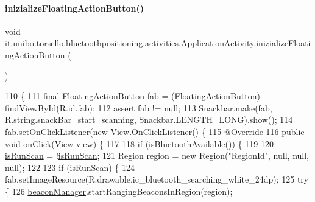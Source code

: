 \paragraph{\texorpdfstring{inizialize\+Floating\+Action\+Button()}{inizializeFloatingActionButton()}}
{\footnotesize\ttfamily void it.\+unibo.\+torsello.\+bluetoothpositioning.\+activities.\+Application\+Activity.\+inizialize\+Floating\+Action\+Button (\begin{DoxyParamCaption}{ }\end{DoxyParamCaption})\hspace{0.3cm}{\ttfamily [private]}}


\begin{DoxyCode}
110                                                   \{
111         \textcolor{keyword}{final} FloatingActionButton fab = (FloatingActionButton) findViewById(R.id.fab);
112         assert fab != null;
113         Snackbar.make(fab, R.string.snackBar\_start\_scanning, Snackbar.LENGTH\_LONG).show();
114         fab.setOnClickListener(\textcolor{keyword}{new} View.OnClickListener() \{
115             @Override
116             \textcolor{keyword}{public} \textcolor{keywordtype}{void} onClick(View view) \{
117 
118                 \textcolor{keywordflow}{if} (\hyperlink{classit_1_1unibo_1_1torsello_1_1bluetoothpositioning_1_1activities_1_1ApplicationActivity_abffd55741be864ad5b151c8f8c6d70ff_abffd55741be864ad5b151c8f8c6d70ff}{isBluetoothAvailable}()) \{
119 
120                     \hyperlink{classit_1_1unibo_1_1torsello_1_1bluetoothpositioning_1_1activities_1_1ApplicationActivity_a16080640c95a73d18c2b7ec21b785af1_a16080640c95a73d18c2b7ec21b785af1}{isRunScan} = !\hyperlink{classit_1_1unibo_1_1torsello_1_1bluetoothpositioning_1_1activities_1_1ApplicationActivity_a16080640c95a73d18c2b7ec21b785af1_a16080640c95a73d18c2b7ec21b785af1}{isRunScan};
121                     Region region = \textcolor{keyword}{new} Region(\textcolor{stringliteral}{"RegionId"}, null, null, null);
122 
123                     \textcolor{keywordflow}{if} (\hyperlink{classit_1_1unibo_1_1torsello_1_1bluetoothpositioning_1_1activities_1_1ApplicationActivity_a16080640c95a73d18c2b7ec21b785af1_a16080640c95a73d18c2b7ec21b785af1}{isRunScan}) \{
124                         fab.setImageResource(R.drawable.ic\_bluetooth\_searching\_white\_24dp);
125                         \textcolor{keywordflow}{try} \{
126                             \hyperlink{classit_1_1unibo_1_1torsello_1_1bluetoothpositioning_1_1activities_1_1ApplicationActivity_a973c37226a3dbba6016966c3555aff65_a973c37226a3dbba6016966c3555aff65}{beaconManager}.startRangingBeaconsInRegion(region);

\end{DoxyCode}
